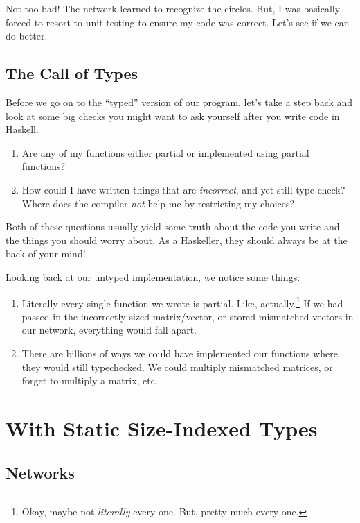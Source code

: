 \documentclass[]{article}
\begin{document}
Not too bad! The network learned to recognize the circles. But, I was basically
forced to resort to unit testing to ensure my code was correct. Let's see if we
can do better.

\subsection{The Call of Types}\label{the-call-of-types}

Before we go on to the ``typed'' version of our program, let's take a step back
and look at some big checks you might want to ask yourself after you write code
in Haskell.

\begin{enumerate}
\def\labelenumi{\arabic{enumi}.}
\tightlist
\item
  Are any of my functions either partial or implemented using partial functions?
\item
  How could I have written things that are \emph{incorrect}, and yet still type
  check? Where does the compiler \emph{not} help me by restricting my choices?
\end{enumerate}

Both of these questions usually yield some truth about the code you write and
the things you should worry about. As a Haskeller, they should always be at the
back of your mind!

Looking back at our untyped implementation, we notice some things:

\begin{enumerate}
\def\labelenumi{\arabic{enumi}.}
\tightlist
\item
  Literally every single function we wrote is partial. Like,
  actually.\footnote{Okay, maybe not \emph{literally} every one. But, pretty
    much every one.} If we had passed in the incorrectly sized matrix/vector, or
  stored mismatched vectors in our network, everything would fall apart.
\item
  There are billions of ways we could have implemented our functions where they
  would still typechecked. We could multiply mismatched matrices, or forget to
  multiply a matrix, etc.
\end{enumerate}

\section{With Static Size-Indexed Types}\label{with-static-size-indexed-types}

\subsection{Networks}\label{networks}
\end{document}

